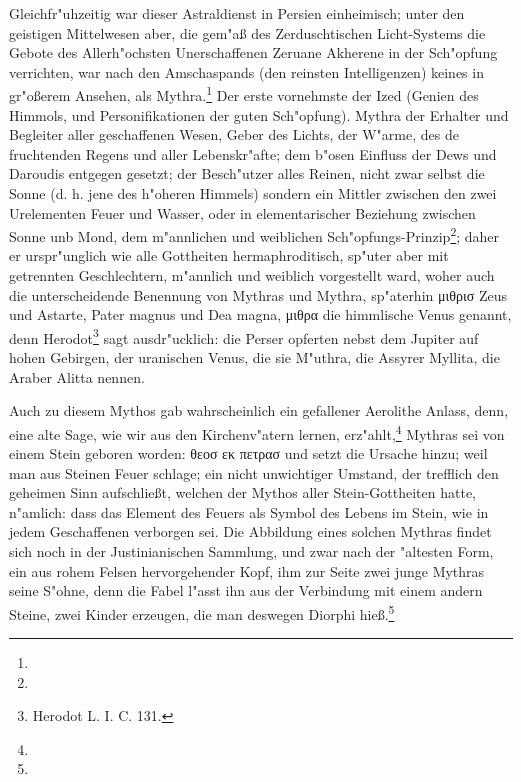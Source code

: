 \documentclass[a4paper, 11pt, oneside, polutonikogreek, german]{article}
\begin{document}
Gleichfr"uhzeitig war dieser Astraldienst in Persien einheimisch; unter den geistigen Mittelwesen aber, die gem"aß des Zerduschtischen Licht-Systems die Gebote des Allerh"ochsten Unerschaffenen Zeruane Akherene in der Sch"opfung verrichten, war nach den Amschaspands (den reinsten Intelligenzen) keines in gr"oßerem Ansehen, als Mythra.\footnote{} Der erste vornehmste der Ized (Genien des Himmols, und Personifikationen der guten Sch"opfung). Mythra der Erhalter und Begleiter aller geschaffenen Wesen, Geber des Lichts, der W"arme, des de fruchtenden Regens und aller Lebenskr"afte; dem b"osen Einfluss der Dews und Daroudis entgegen gesetzt; der Besch"utzer alles Reinen, nicht zwar selbst die Sonne (d. h. jene des h"oheren Himmels) sondern ein Mittler zwischen den zwei Urelementen Feuer und Wasser, oder in elementarischer Beziehung zwischen Sonne unb Mond, dem m"annlichen und weiblichen Sch"opfungs-Prinzip\footnote{}; daher er urspr"unglich wie alle Gottheiten hermaphroditisch, sp"uter aber mit getrennten Geschlechtern, m"annlich und weiblich vorgestellt ward, woher auch die unterscheidende Benennung von Mythras und Mythra, sp"aterhin μιθρισ Zeus und Astarte, Pater magnus und Dea magna, μιθρα die himmlische Venus genannt, denn Herodot\footnote{Herodot L. I. C. 131.} sagt ausdr"ucklich: die Perser opferten nebst dem Jupiter auf hohen Gebirgen, der uranischen Venus, die sie M"uthra, die Assyrer Myllita, die Araber Alitta nennen.

Auch zu diesem Mythos gab wahrscheinlich ein gefallener Aerolithe Anlass, denn, eine alte Sage, wie wir aus den Kirchenv"atern lernen, erz"ahlt,\footnote{} Mythras sei von einem Stein geboren worden: θεοσ εκ πετρασ und setzt die Ursache hinzu; weil man aus Steinen Feuer schlage; ein nicht unwichtiger Umstand, der trefflich den geheimen Sinn aufschließt, welchen der Mythos aller Stein-Gottheiten hatte, n"amlich: dass das Element des Feuers als Symbol des Lebens im Stein, wie in jedem Geschaffenen verborgen sei. Die Abbildung eines solchen Mythras findet sich noch in der Justinianischen Sammlung, und zwar nach der "altesten Form, ein aus rohem Felsen hervorgehender Kopf, ihm zur Seite zwei junge Mythras seine S"ohne, denn die Fabel l"asst ihn aus der Verbindung mit einem andern Steine, zwei Kinder erzeugen, die man deswegen Diorphi hieß.\footnote{}
\end{document}
